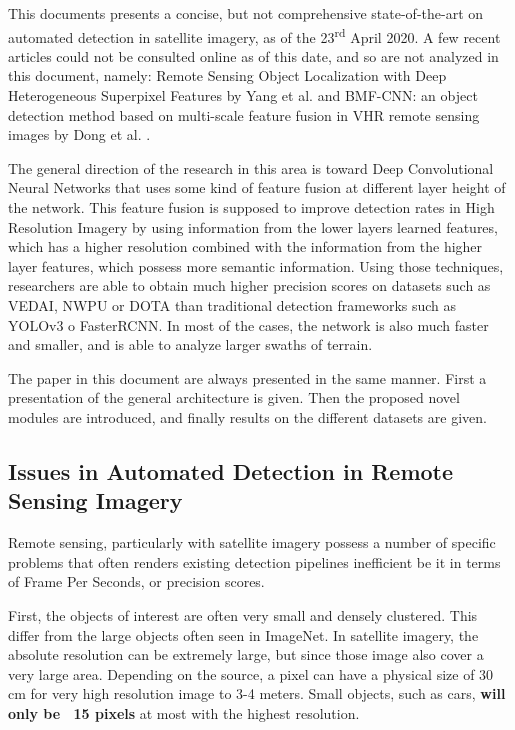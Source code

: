 This documents presents a concise, but not comprehensive state-of-the-art on automated detection in satellite imagery, as of the 23\textsuperscript{rd} April 2020. A few recent articles could not be consulted online as of this date, and so are not analyzed in this document, namely: Remote Sensing Object Localization with Deep Heterogeneous Superpixel Features by Yang et al.\cite{Yang2019} and BMF-CNN: an object detection method based on multi-scale feature fusion in VHR remote sensing images by Dong et al. \cite{Dong2020}.

The general direction of the research in this area is toward Deep Convolutional Neural Networks that uses some kind of feature fusion at different layer height of the network. This feature fusion is supposed to improve detection rates in High Resolution Imagery by using information from the lower layers learned features, which has a higher resolution combined with the information from the higher layer features, which possess more semantic information. Using those techniques, researchers are able to obtain much higher precision scores on datasets such as VEDAI\cite{vedai}, NWPU\cite{nwpu} or DOTA\cite{dota} than traditional detection frameworks such as YOLOv3\cite{yolov3} o FasterRCNN\cite{FasterRCNN}. In most of the cases, the network is also much faster and smaller, and is able to analyze larger swaths of terrain.

The paper in this document are always presented in the same manner. First a presentation of the general architecture is given. Then the proposed novel modules are introduced, and finally results on the different datasets are given.

\subsection{Issues in Automated Detection in Remote Sensing Imagery}%
Remote sensing, particularly with satellite imagery possess a number of specific problems that often renders existing detection pipelines inefficient be it in terms of Frame Per Seconds, or precision scores. 

First, the objects of interest are often very small and densely clustered. This differ from the large objects often seen in ImageNet. In satellite imagery, the absolute resolution can be extremely large, but since those image also cover a very large area. Depending on the source, a pixel can have a physical size of $30$ cm for very high resolution image to 3-4 meters. Small objects, such as cars, \textbf{will only be ~15 pixels} at most with the highest resolution.

